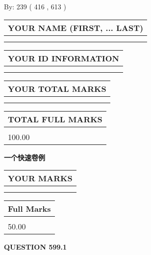 \documentclass{ctexart}
\begin{document}
   
\hspace{1.0in} By: 
 239 ( 416 ,  613 )
   
   
   
   
\newpage 
\setcounter{page}{ 
   599001 } 
   
   
   
   
\noindent\begin{tabular}{|l|}
\hline
YOUR NAME (FIRST, ... LAST)  \\
\hline
 \\ 
 \\ 
\hline
\end{tabular}
\hspace{0.05in} \begin{tabular}{|l|}
\hline
 YOUR   ID   INFORMATION  \\
\hline
 \\ 
 \\ 
\hline
\end{tabular}
   
   
\vspace{0.2in}\noindent\begin{tabular}{|l|}
\hline
YOUR TOTAL MARKS  \\
\hline
 \\ 
 \\ 
\hline
\end{tabular}
\hspace{0.05in} \begin{tabular}{|l|}
\hline
TOTAL FULL MARKS  \\
\hline
 \\ 
100.00 \\
\hline
\end{tabular}
   
   
 \vspace{0.2in}
{\LARGE {\textbf{ 一个快速卷例}}}
   
   
  
\vspace{0.2in}
  
\noindent\begin{tabular}{|l|}
\hline
 YOUR MARKS  \\
\hline
 \\ 
 \\ 
\hline
\end{tabular}
\hspace{0.05in} \begin{tabular}{|l|}
\hline
 Full Marks  \\
\hline
 \\ 
50.00 \\
\hline
\end{tabular}
{\textbf{\Large{QUESTION
599.1 
}}}
  
\end{document}

